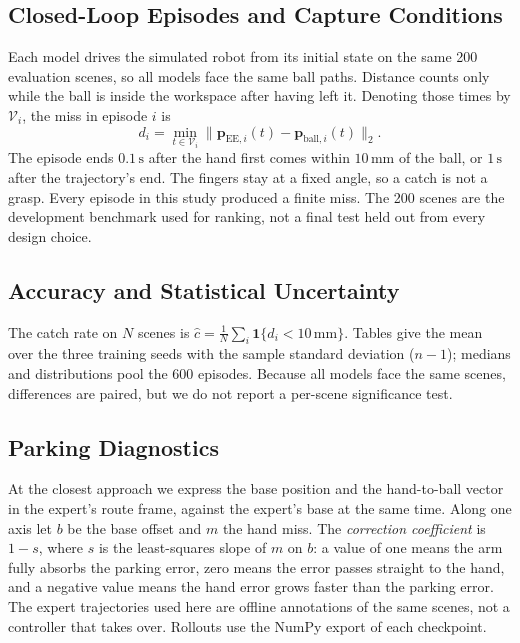 \documentclass[conference]{IEEEtran}
\begin{document}
\subsection{Closed-Loop Episodes and Capture Conditions}
Each model drives the simulated robot from its initial state on the same 200 evaluation scenes, so all models face the same ball paths. Distance counts only while the ball is inside the workspace after having left it. Denoting those times by $\mathcal{V}_i$, the miss in episode $i$ is
\begin{equation}
 d_i=\min_{t\in\mathcal{V}_i}\|\mathbf{p}_{\mathrm{EE},i}(t)-\mathbf{p}_{\mathrm{ball},i}(t)\|_2 .
\end{equation}
The episode ends $0.1\,\mathrm{s}$ after the hand first comes within $10\,\mathrm{mm}$ of the ball, or $1\,\mathrm{s}$ after the trajectory's end. The fingers stay at a fixed angle, so a catch is not a grasp. Every episode in this study produced a finite miss. The 200 scenes are the development benchmark used for ranking, not a final test held out from every design choice.

\subsection{Accuracy and Statistical Uncertainty}
The catch rate on $N$ scenes is $\hat{c}=\frac{1}{N}\sum_{i}\mathbf{1}\{d_i<10\,\mathrm{mm}\}$. Tables give the mean over the three training seeds with the sample standard deviation ($n-1$); medians and distributions pool the 600 episodes. Because all models face the same scenes, differences are paired, but we do not report a per-scene significance test.

\subsection{Parking Diagnostics}
At the closest approach we express the base position and the hand-to-ball vector in the expert's route frame, against the expert's base at the same time. Along one axis let $b$ be the base offset and $m$ the hand miss. The \emph{correction coefficient} is $1-s$, where $s$ is the least-squares slope of $m$ on $b$: a value of one means the arm fully absorbs the parking error, zero means the error passes straight to the hand, and a negative value means the hand error grows faster than the parking error. The expert trajectories used here are offline annotations of the same scenes, not a controller that takes over. Rollouts use the NumPy export of each checkpoint.
\end{document}
